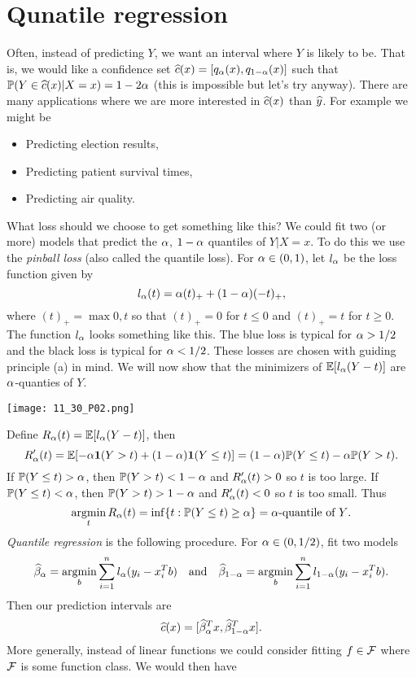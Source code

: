 \section{Qunatile regression}
Often, instead of predicting $Y$, we want an interval where $Y$ is likely to be. That is, we would like a confidence set $\widehat{c}(x)=[q_{\alpha}(x),q_{1-{\alpha}}(x)]$ such that ${\mathbb{P}}(Y \in \widehat{c}(x)|X=x)=1-2{\alpha}$ (this is impossible but let's try anyway). There are many applications where we are more interested in $\widehat{c}(x)$ than $\widehat{y}$. For example we might be
\begin{itemize}
    \item Predicting election results,
    \item Predicting patient survival times,
    \item Predicting air quality.
\end{itemize}
What loss should we choose to get something like this? We could fit two (or more) models that predict the ${\alpha}$, $1-{\alpha}$ quantiles of $Y|X=x$. To do this we use the \emph{pinball loss} (also called the quantile loss). For ${\alpha} \in (0,1)$, let $l_{\alpha}$ be the loss function given by
\[l_{\alpha}(t)={\alpha}(t)_++(1-{\alpha})(-t)_+, \]
where $(t)_+=\max{0,t}$ so that $(t)_+=0$ for $t \le 0$ and $(t)_+=t$ for $t\ge 0$. The function $l_{\alpha}$ looks something like this. The blue loss is typical for ${\alpha} > 1/2$ and the black loss is typical for ${\alpha} < 1/2$. 
These losses are chosen with guiding principle (a) in mind. We will now show that the minimizers of ${\mathbb{E}}[l_{\alpha}(Y-t)]$ are ${\alpha}$-quanties of $Y$.
\begin{center}
    \texttt{[image: 11\_30\_P02.png]}
\end{center} Define $R_{\alpha}(t)={\mathbb{E}}[l_{\alpha}(Y-t)]$, then
\[R_{\alpha}'(t)={\mathbb{E}}[-{\alpha}{{\bf 1}}(Y >t)+(1-{\alpha}){{\bf 1}}(Y \le t)]=(1-{\alpha}){\mathbb{P}}(Y \le t)-{\alpha}{\mathbb{P}}(Y >t).\]
If ${\mathbb{P}}(Y \le t)>{\alpha}$, then ${\mathbb{P}}(Y > t) < 1-{\alpha}$ and $R'_{\alpha}(t) > 0$ so $t$ is too large. If ${\mathbb{P}}(Y \le t)< {\alpha}$, then ${\mathbb{P}}(Y > t)>1-{\alpha}$ and $R'_{\alpha}(t)<0$ so $t$ is too small. Thus
\[\operatorname*{argmin}_t R_{\alpha}(t)=\inf\{t:{\mathbb{P}}(Y \le t) \ge {\alpha}\} = {\alpha}\text{-quantile of $Y$}.\]
\emph{Quantile regression} is the following procedure. For ${\alpha} \in (0,1/2)$, fit two models 
\[\widehat{\beta}_{\alpha} = \operatorname*{argmin}_b \sum_{i=1}^n l_{\alpha}(y_i-x_i^Tb)~~~\text{and}~~~ \widehat{\beta}_{1-{\alpha}} = \operatorname*{argmin}_b\sum_{i=1}^n l_{1-{\alpha}}(y_i-x_i^Tb).\]
Then our prediction intervals are 
\[\widehat{c}(x)=[\widehat{\beta}_{\alpha}^T x, \widehat{\beta}_{1-{\alpha}}^Tx].\]
More generally, instead of linear functions we could consider fitting $f \in {\mathcal{F}}$ where ${\mathcal{F}}$ is some function class. We would then have
